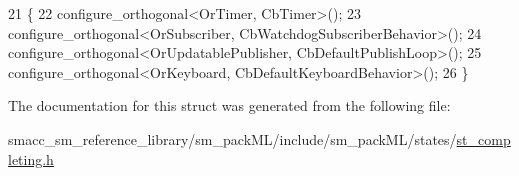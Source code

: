 \begin{DoxyCode}
21     \{
22         configure\_orthogonal<OrTimer, CbTimer>();   
23         configure\_orthogonal<OrSubscriber, CbWatchdogSubscriberBehavior>();
24         configure\_orthogonal<OrUpdatablePublisher, CbDefaultPublishLoop>();
25         configure\_orthogonal<OrKeyboard, CbDefaultKeyboardBehavior>();
26     \}
\end{DoxyCode}


The documentation for this struct was generated from the following file\+:\begin{DoxyCompactItemize}
\item 
smacc\+\_\+sm\+\_\+reference\+\_\+library/sm\+\_\+pack\+M\+L/include/sm\+\_\+pack\+M\+L/states/\hyperlink{st__completing_8h}{st\+\_\+completing.\+h}\end{DoxyCompactItemize}
